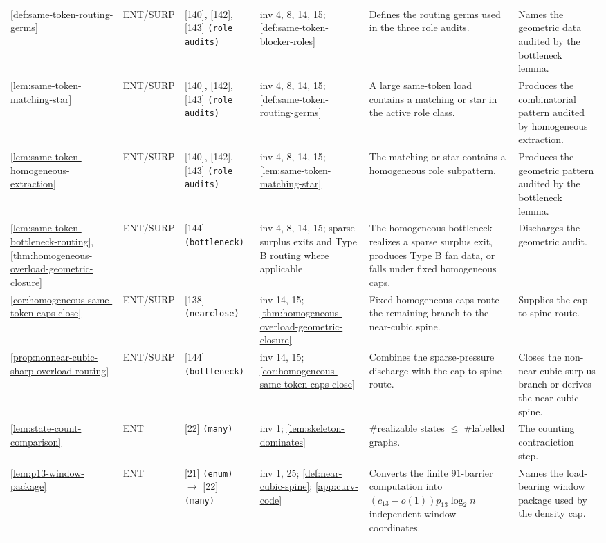 \documentclass[11pt]{article}
\begin{document}
{\begin{longtable}{L{0.10\textwidth} C{0.045\textwidth} L{0.13\textwidth} L{0.135\textwidth} L{0.28\textwidth} L{0.20\textwidth}}
\cref{def:same-token-routing-germs} & ENT\slash SURP & [140], [142], [143] \texttt{(role audits)} & inv 4, 8, 14, 15; \cref{def:same-token-blocker-roles} & Defines the routing germs used in the three role audits. & Names the geometric data audited by the bottleneck lemma. \\
\cref{lem:same-token-matching-star} & ENT\slash SURP & [140], [142], [143] \texttt{(role audits)} & inv 4, 8, 14, 15; \cref{def:same-token-routing-germs} & A large same-token load contains a matching or star in the active role class. & Produces the combinatorial pattern audited by homogeneous extraction. \\
\cref{lem:same-token-homogeneous-extraction} & ENT\slash SURP & [140], [142], [143] \texttt{(role audits)} & inv 4, 8, 14, 15; \cref{lem:same-token-matching-star} & The matching or star contains a homogeneous role subpattern. & Produces the geometric pattern audited by the bottleneck lemma. \\
\cref{lem:same-token-bottleneck-routing}, \cref{thm:homogeneous-overload-geometric-closure} & ENT\slash SURP & [144] \texttt{(bottleneck)} & inv 4, 8, 14, 15; sparse surplus exits and Type B routing where applicable & The homogeneous bottleneck realizes a sparse surplus exit, produces Type B fan data, or falls under fixed homogeneous caps. & Discharges the geometric audit. \\
\cref{cor:homogeneous-same-token-caps-close} & ENT\slash SURP & [138] \texttt{(nearclose)} & inv 14, 15; \cref{thm:homogeneous-overload-geometric-closure} & Fixed homogeneous caps route the remaining branch to the near-cubic spine. & Supplies the cap-to-spine route. \\
\cref{prop:nonnear-cubic-sharp-overload-routing} & ENT\slash SURP & [144] \texttt{(bottleneck)} & inv 14, 15; \cref{cor:homogeneous-same-token-caps-close} & Combines the sparse-pressure discharge with the cap-to-spine route. & Closes the non-near-cubic surplus branch or derives the near-cubic spine. \\
\cref{lem:state-count-comparison} & ENT & [22] \texttt{(many)} & inv 1; \cref{lem:skeleton-dominates} & \#realizable states $\le$ \#labelled graphs. & The counting contradiction step. \\
\cref{lem:p13-window-package} & ENT & [21] \texttt{(enum)} $\to$ [22] \texttt{(many)} & inv 1, 25; \cref{def:near-cubic-spine}; \cref{app:curv-code} & Converts the finite \(91\)-barrier computation into \((c_{13}-o(1))p_{13}\log_2 n\) independent window coordinates. & Names the load-bearing window package used by the density cap. \\

\end{longtable}}
\end{document}
